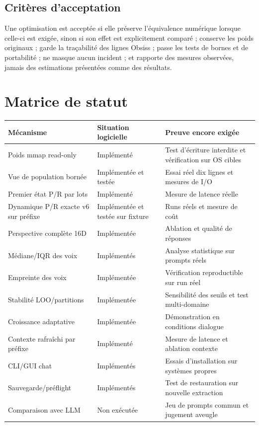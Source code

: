 \documentclass[11pt,a4paper]{report}
\begin{document}
\section{Critères d'acceptation}
Une optimisation est acceptée si elle préserve l'équivalence numérique lorsque celle-ci est exigée, sinon si son effet est explicitement comparé ; conserve les poids originaux ; garde la traçabilité des lignes Obsiss ; passe les tests de bornes et de portabilité ; ne masque aucun incident ; et rapporte des mesures observées, jamais des estimations présentées comme des résultats.

\chapter{Matrice de statut}
\begin{longtable}{p{}p{}p{}}
\toprule
Mécanisme & Situation logicielle & Preuve encore exigée \\
\midrule
Poids mmap read-only & Implémenté & Test d'écriture interdite et vérification sur OS cibles \\
Vue de population bornée & Implémentée et testée & Essai réel dix lignes et mesures de I/O \\
Premier état P/R par lots & Implémenté & Mesure de latence réelle \\
Dynamique P/R exacte v6 sur préfixe & Implémentée et testée sur fixture & Runs réels et mesure de coût \\
Perspective complète 16D & Implémentée & Ablation et qualité de réponses \\
Médiane/IQR des voix & Implémentés & Analyse statistique sur prompts réels \\
Empreinte des voix & Implémentée & Vérification reproductible sur run réel \\
Stabilité LOO/partitions & Implémentée & Sensibilité des seuils et test multi-domaine \\
Croissance adaptative & Implémentée & Démonstration en conditions dialogue \\
Contexte rafraîchi par préfixe & Implémenté & Mesure de latence et ablation contexte \\
CLI/GUI chat & Implémentés & Essais d'installation sur systèmes propres \\
Sauvegarde/préflight & Implémentés & Test de restauration sur nouvelle extraction \\
Comparaison avec LLM & Non exécutée & Jeu de prompts commun et jugement aveugle \\
\bottomrule
\end{longtable}
\end{document}
